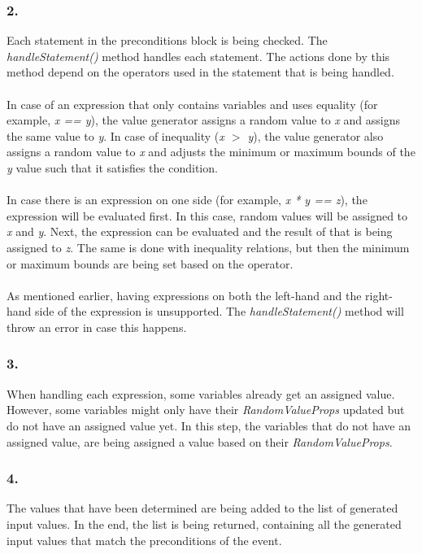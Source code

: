 \subsubsection{2. }
Each statement in the preconditions block is being checked. The
\textit{handleStatement()} method handles each statement. The actions done by
this method depend on the operators used in the statement that is being
handled.\\
\\
In case of an expression that only contains variables and uses equality
(for example, \textit{x == y}), the value generator assigns a random value to
\textit{x} and assigns the same value to \textit{y}. In case of inequality
(\textit{x $>$ y}), the value generator also assigns a random value to
\textit{x} and adjusts the minimum or maximum bounds of the \textit{y} value
such that it satisfies the condition.\\
\\
In case there is an expression on one side (for example, \textit{x * y == z}),
the expression will be evaluated first. In this case, random values will be
assigned to \textit{x} and \textit{y}. Next, the expression can be evaluated and
the result of that is being assigned to \textit{z}. The same is done with
inequality relations, but then the minimum or maximum bounds are being set based
on the operator.\\
\\
As mentioned earlier, having expressions on both the left-hand and the
right-hand side of the expression is unsupported. The \textit{handleStatement()}
method will throw an error in case this happens.

\subsubsection{3. }
When handling each expression, some variables already get an assigned value.
However, some variables might only have their \textit{RandomValueProps} updated
but do not have an assigned value yet. In this step, the variables that do not
have an assigned value, are being assigned a value based on their
\textit{RandomValueProps}.

\subsubsection{4. }
The values that have been determined are being added to the list of generated
input values. In the end, the list is being returned, containing all the
generated input values that match the preconditions of the event.

